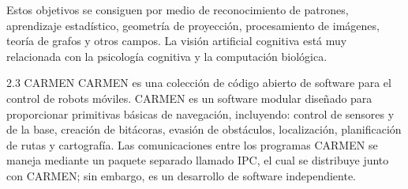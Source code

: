 Estos objetivos se consiguen por medio de reconocimiento de patrones, aprendizaje estadístico, geometría de proyección, procesamiento de imágenes, teoría de grafos y otros campos. La visión artificial cognitiva está muy relacionada con la psicología cognitiva y la computación biológica.

2.3	CARMEN
CARMEN es una colección de código abierto de software para el control de robots móviles. CARMEN es un software modular diseñado para proporcionar primitivas básicas de navegación, incluyendo: control de sensores y de la base, creación de bitácoras, evasión de obstáculos, localización, planificación de rutas y cartografía.
Las comunicaciones entre los programas CARMEN se maneja mediante un paquete separado llamado IPC, el cual se distribuye junto con CARMEN; sin embargo, es un desarrollo de software independiente.

